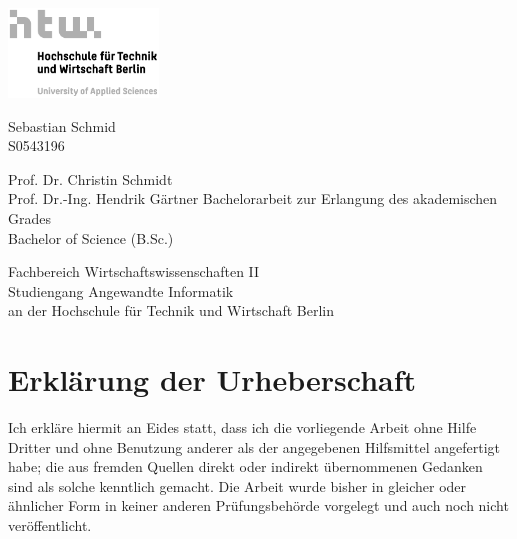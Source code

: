 

\begin{titlepage}
    \begin{addmargin}[4cm]{-1cm}
        \centering
        \hfill\includegraphics[width=4cm]{pix/S07_HTW_Berlin_Logo_pos_GRAU_RGB.jpg}\par
        \vspace{4\baselineskip}
        {\Huge
        \par}
        \vspace{4\baselineskip}

        \par
        {\Large Sebastian Schmid \\ S0543196 \par}
        \vfill
        {Prof. Dr. Christin Schmidt \\ Prof. Dr.-Ing. Hendrik Gärtner}
        \vfill
        Bachelorarbeit zur Erlangung des akademischen Grades\\ Bachelor of Science (B.Sc.)\par
        {Fachbereich Wirtschaftswissenschaften II \\ Studiengang Angewandte Informatik \\ an der Hochschule für Technik und Wirtschaft Berlin}
    \end{addmargin}
\end{titlepage}

\newpage

\section*{Erklärung der Urheberschaft}\thispagestyle{empty}

Ich erkläre hiermit an Eides statt, dass ich die vorliegende Arbeit
ohne Hilfe Dritter und ohne Benutzung anderer als der angegebenen
Hilfsmittel angefertigt habe; die aus fremden Quellen direkt oder
indirekt übernommenen Gedanken sind als solche kenntlich gemacht. Die
Arbeit wurde bisher in gleicher oder ähnlicher Form in keiner anderen
Prüfungsbehörde vorgelegt und auch noch nicht veröffentlicht.


